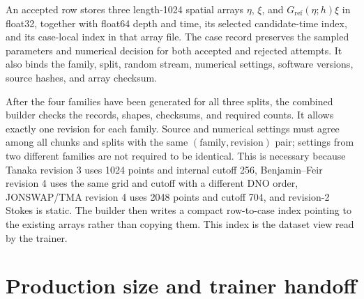 \documentclass[10pt]{article}
\newcommand{\Gref}{G_{\mathrm{ref}}}
\begin{document}
An accepted row stores three length-1024 spatial arrays
$\eta$, $\xi$, and $\Gref(\eta;h)\xi$ in float32, together with float64 depth
and time, its selected candidate-time index, and its case-local index in that
array file.
The case record preserves the sampled parameters and numerical decision for
both accepted and rejected attempts.  It also binds the family, split,
random stream, numerical settings, software versions, source hashes, and
array checksum.

After the four families have been generated for all three splits, the
combined builder checks the records, shapes, checksums, and required counts.
It allows exactly one revision for each family.  Source and numerical
settings must agree among all chunks and splits with the same
$(\text{family},\text{revision})$ pair; settings from two different families
are not required to be identical.  This is necessary because Tanaka revision
3 uses 1024 points and internal cutoff 256, Benjamin--Feir revision 4 uses the
same grid and cutoff with a different DNO order, JONSWAP/TMA revision 4 uses
2048 points and cutoff 704, and revision-2 Stokes is static.  The builder then writes
a compact row-to-case index pointing to the existing
arrays rather than copying them.  This index is the dataset view read by the
trainer.

\section{Production size and trainer handoff}
\label{sec:handoff}
\end{document}
